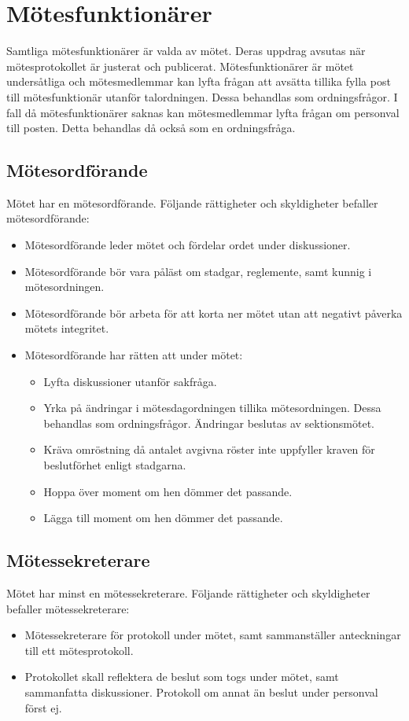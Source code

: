 \documentclass[11pt, includeaddress]{classes/cthit}
\begin{document}
\newpage

\newpage
\section{Mötesfunktionärer}
Samtliga mötesfunktionärer är valda av mötet. Deras uppdrag avsutas när mötesprotokollet är justerat och publicerat. Mötesfunktionärer är mötet undersåtliga och mötesmedlemmar kan lyfta frågan att avsätta tillika fylla post till mötesfunktionär utanför talordningen. Dessa behandlas som ordningsfrågor. I fall då mötesfunktionärer saknas kan mötesmedlemmar lyfta frågan om personval till posten.
Detta behandlas då också som en ordningsfråga.
\subsection{Mötesordförande}
Mötet har en mötesordförande. Följande rättigheter och skyldigheter befaller mötesordförande:
\begin{itemize}
    \item Mötesordförande leder mötet och fördelar ordet under diskussioner.
    \item Mötesordförande bör vara påläst om stadgar, reglemente, samt kunnig i mötesordningen.
    \item Mötesordförande bör arbeta för att korta ner mötet utan att negativt påverka mötets integritet.
    \item Mötesordförande har rätten att under mötet:
    \begin{itemize}
        \item Lyfta diskussioner utanför sakfråga.
        \item Yrka på ändringar i mötesdagordningen tillika mötesordningen. Dessa behandlas som ordningsfrågor. Ändringar beslutas av sektionsmötet.
        \item Kräva omröstning då antalet avgivna röster inte uppfyller kraven för beslutförhet enligt stadgarna.
        \item Hoppa över moment om hen dömmer det passande.
        \item Lägga till moment om hen dömmer det passande.
    \end{itemize}
\end{itemize}
\subsection{Mötessekreterare}
Mötet har minst en mötessekreterare. Följande rättigheter och skyldigheter befaller mötessekreterare:
\begin{itemize}
    \item Mötessekreterare för protokoll under mötet, samt sammanställer anteckningar till ett mötesprotokoll.
    \item Protokollet skall reflektera de beslut som togs under mötet, samt sammanfatta diskussioner. Protokoll om annat än beslut under personval först ej.
\end{itemize}
\end{document}
